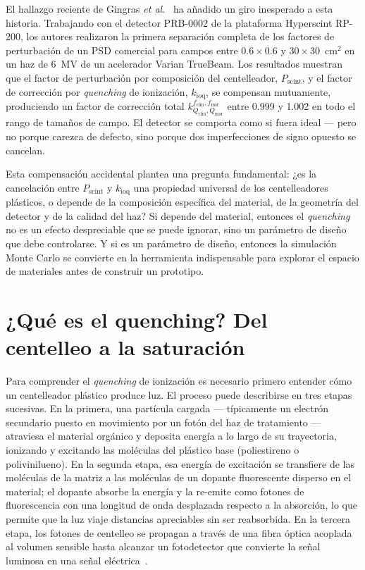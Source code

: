 \documentclass[11pt,a4paper]{article}
\begin{document}
El hallazgo reciente de Gingras \textit{et al.}~\cite{gingras2025} ha añadido un giro inesperado a esta historia. Trabajando con el detector PRB-0002 de la plataforma Hyperscint RP-200, los autores realizaron la primera separación completa de los factores de perturbación de un PSD comercial para campos entre $0{.}6 \times 0{.}6$ y $30 \times 30$~cm$^{2}$ en un haz de 6~MV de un acelerador Varian TrueBeam. Los resultados muestran que el factor de perturbación por composición del centelleador, $P_{\mathrm{scint}}$, y el factor de corrección por \textit{quenching} de ionización, $k_{\mathrm{ioq}}$, se compensan mutuamente, produciendo un factor de corrección total $k^{f_{\mathrm{clin}},f_{\mathrm{msr}}}_{Q_{\mathrm{clin}},Q_{\mathrm{msr}}}$ entre 0.999 y 1.002 en todo el rango de tamaños de campo. El detector se comporta como si fuera ideal --- pero no porque carezca de defecto, sino porque dos imperfecciones de signo opuesto se cancelan.

Esta compensación accidental plantea una pregunta fundamental: ¿es la cancelación entre $P_{\mathrm{scint}}$ y $k_{\mathrm{ioq}}$ una propiedad universal de los centelleadores plásticos, o depende de la composición específica del material, de la geometría del detector y de la calidad del haz? Si depende del material, entonces el \textit{quenching} no es un efecto despreciable que se puede ignorar, sino un parámetro de diseño que debe controlarse. Y si es un parámetro de diseño, entonces la simulación Monte Carlo se convierte en la herramienta indispensable para explorar el espacio de materiales antes de construir un prototipo.

\section{¿Qué es el quenching? Del centelleo a la saturación}



Para comprender el \textit{quenching} de ionización es necesario primero entender cómo un centelleador plástico produce luz. El proceso puede describirse en tres etapas sucesivas. En la primera, una partícula cargada --- típicamente un electrón secundario puesto en movimiento por un fotón del haz de tratamiento --- atraviesa el material orgánico y deposita energía a lo largo de su trayectoria, ionizando y excitando las moléculas del plástico base (poliestireno o polivinilueno). En la segunda etapa, esa energía de excitación se transfiere de las moléculas de la matriz a las moléculas de un dopante fluorescente disperso en el material; el dopante absorbe la energía y la re-emite como fotones de fluorescencia con una longitud de onda desplazada respecto a la absorción, lo que permite que la luz viaje distancias apreciables sin ser reabsorbida. En la tercera etapa, los fotones de centelleo se propagan a través de una fibra óptica acoplada al volumen sensible hasta alcanzar un fotodetector que convierte la señal luminosa en una señal eléctrica~\cite{beddar1992}.
\end{document}
